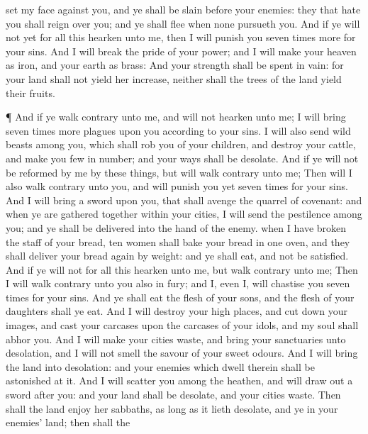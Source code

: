 {set my
face against you, and ye shall be
slain
before your
enemies: they that
hate you shall
reign over you; and ye shall
flee when none
pursueth you.
And if ye will not
yet for all this
hearken unto me, then I will
punish you seven
times
more for your
sins.
And I will
break the
pride of your
power; and I will
make your
heaven as
iron, and your
earth as
brass:
And your
strength shall be
spent in
vain: for your
land shall not
yield her
increase, neither shall the
trees of the
land
yield their
fruits.
\par }{\PP {}¶ And if ye
walk
contrary unto me, and
will not
hearken unto me; I will
bring seven
times
more
plagues upon you according to your
sins.
I will also
send
wild
beasts among you, which shall rob you of your
children, and
destroy your
cattle, and make you few in
number; and your
{}
ways shall be
desolate.
And if ye will not be
reformed by me by these things, but will
walk
contrary unto me;
Then will I also
walk
contrary unto you, and will
punish you
yet seven
times for your
sins.
And I will
bring a
sword upon you, that shall
avenge the
quarrel of
{}
covenant: and when ye are gathered
together
within your
cities, I will
send the
pestilence
among you; and ye shall be
delivered into the
hand of the
enemy.
 when I have
broken the
staff of your
bread,
ten
women shall
bake your
bread in
one
oven, and they shall
deliver
{} your
bread
again by
weight: and ye shall
eat, and not be
satisfied.
And if ye will not for all
this
hearken unto me, but
walk
contrary unto me;
Then I will
walk
contrary unto you also in
fury; and I,
even I, will
chastise you seven
times for your
sins.
And ye shall
eat the
flesh of your
sons, and the
flesh of your
daughters shall ye
eat.
And I will
destroy your high
places, and cut
down your
images, and
cast your
carcases upon the
carcases of your
idols, and my
soul shall
abhor you.
And I will
make your
cities
waste, and
bring your
sanctuaries unto
desolation, and I will not
smell the
savour of your sweet
odours.
And I will
bring the
land into
desolation: and your
enemies which
dwell therein shall be
astonished at it.
And I will
scatter you among the
heathen, and will draw
out a
sword
after you: and your
land shall be
desolate, and your
cities
waste.
Then shall the
land
enjoy her
sabbaths, as
long as it lieth
desolate, and ye
{} in your
enemies’
land;
{} then shall the
}
